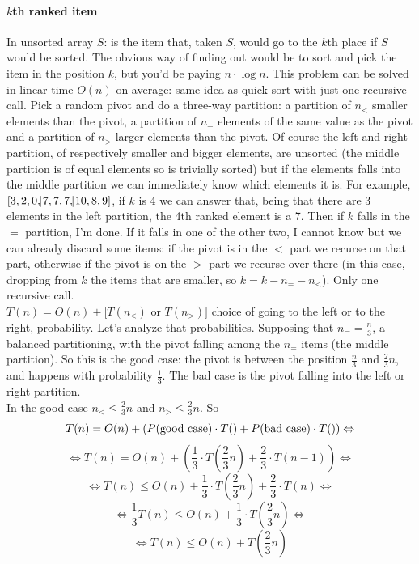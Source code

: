 \documentclass[10pt]{report}
\begin{document}
\paragraph{$k$th ranked item} In unsorted array $S$: is the item that, taken $S$, would go to the $k$th place if $S$ would be sorted. The obvious way of finding out would be to sort and pick the item in the position $k$, but you'd be paying $n\cdot\log n$. This problem can be solved in linear time $O(n)$ on average: same idea as quick sort with just one recursive call. Pick a random pivot and do a three-way partition: a partition of $n_<$ smaller elements than the pivot, a partition of $n_=$ elements of the same value as the pivot and a partition of $n_>$ larger elements than the pivot. Of course the left and right partition, of respectively smaller and bigger elements, are unsorted (the middle partition is of equal elements so is trivially sorted) but if the elements falls into the middle partition we can immediately know which elements it is. For example, $[3,2,0,\vline7,7,7,\vline10,8,9]$, if $k$ is 4 we can answer that, being that there are $3$ elements in the left partition, the 4th ranked element is a 7. Then if $k$ falls in the $=$ partition, I'm done. If it falls in one of the other two, I cannot know but we can already discard some items: if the pivot is in the $<$ part we recurse on that part, otherwise if the pivot is on the $>$ part we recurse over there (in this case, dropping from $k$ the items that are smaller, so $k = k - n_= - n_<$). Only one recursive call.\\
$T(n) = O(n) + [T(n_<)$ or $T(n_>)]$ choice of going to the left or to the right, probability. Let's analyze that probabilities. Supposing that $n_= = \frac{n}{3}$, a balanced partitioning, with the pivot falling among the $n_=$ items (the middle partition). So this is the good case: the pivot is between the position $\frac{n}{3}$ and $\frac{2}{3}n$, and happens with probability $\frac{1}{3}$. The bad case is the pivot falling into the left or right partition.\\
In the good case $n_< \leq \frac{2}{3}n$ and $n_> \leq 	\frac{2}{3}n$. So $$T(n) = O(n) + (P(\hbox{good case})\cdot T() + P(\hbox{bad case})\cdot T()) \Leftrightarrow$$
$$\Leftrightarrow T(n) = O(n) + \left(\frac{1}{3}\cdot T\left(\frac{2}{3}n\right) + \frac{2}{3}\cdot T(n - 1)\right) \Leftrightarrow$$
$$\Leftrightarrow T(n) \leq O(n) + \frac{1}{3}\cdot T\left(\frac{2}{3}n\right) + \frac{2}{3}\cdot T(n) \Leftrightarrow$$
$$\Leftrightarrow \frac{1}{3}T(n) \leq O(n) + \frac{1}{3}\cdot T\left(\frac{2}{3}n\right) \Leftrightarrow$$
$$\Leftrightarrow T(n) \leq O(n) + T\left(\frac{2}{3}n\right)$$
\end{document}
